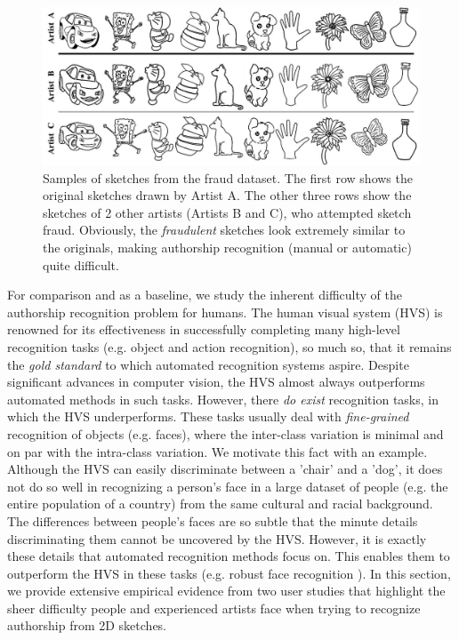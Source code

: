 \begin{figure}[htbp!]
\centering
\includegraphics[width = 1.0\textwidth]{images/fraudExperiment.jpg}
\vspace{-6mm}\caption {Samples of sketches from the fraud dataset. The first row shows the original sketches drawn by Artist A. The other three rows show the sketches of 2 other artists (Artists B and C), who attempted  sketch fraud. Obviously, the \emph{fraudulent} sketches look extremely similar to the originals, making authorship recognition (manual or automatic) quite difficult.}\vspace{-5mm}
\label{FraudDataset}
\end{figure}

For comparison and as a baseline, we study the inherent difficulty of the authorship recognition problem for humans. The human visual system (HVS) is renowned for its effectiveness in successfully completing many high-level recognition tasks (e.g. object and action recognition), so much so, that it remains the \emph{gold standard} to which automated recognition systems aspire. Despite significant advances in computer vision, the HVS almost always outperforms automated methods in such tasks. However, there \emph{do exist} recognition tasks, in which the HVS underperforms. These tasks usually deal with \emph{fine-grained} recognition of objects (e.g. faces), where the inter-class variation is minimal and on par with the intra-class variation. We motivate this fact with an example. Although the HVS can easily discriminate between a 'chair' and a 'dog', it does not do so well in recognizing a person's face in a large dataset of people (e.g. the entire population of a country) from the same cultural and racial background. The differences between people's faces are so subtle that the minute details discriminating them cannot be uncovered by the HVS. However, it is exactly these details that automated recognition methods focus on. This enables them to outperform the HVS in these tasks (e.g. robust face recognition \cite{4483511}). In this section, we provide extensive empirical evidence from two user studies that highlight the sheer difficulty people and experienced artists face when trying to recognize authorship from 2D sketches.%

